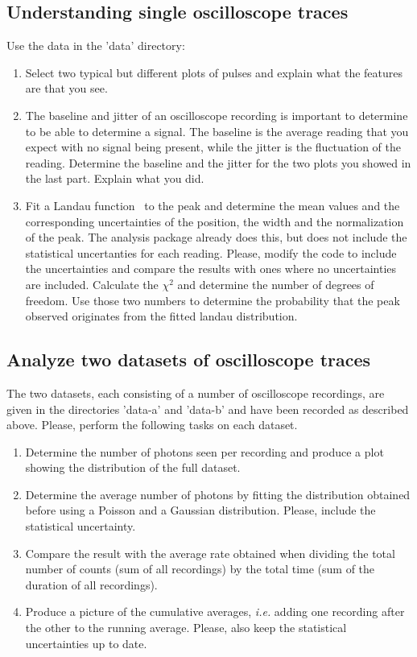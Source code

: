 \documentclass[10pt,aps,twocolumn,secnumarabic,balancelastpage,amsmath,amssymb,nofootinbib,floatfix]{revtex4}
\begin{document}
\subsection{Understanding single oscilloscope traces}
Use the data in the 'data' directory:
\begin{enumerate}
\item Select two typical but different plots of pulses and explain what the features are that you see.
\item The baseline and jitter of an oscilloscope recording is important to determine to be able to determine a signal. The baseline is the average reading that you expect with no signal being present, while the jitter is the fluctuation of the reading. Determine the baseline and the jitter for the two plots you showed in the last part. Explain what you did.
\item Fit a Landau function~\cite{cite:plandau} to the peak and determine the mean values and the corresponding uncertainties of the position, the width and the normalization of the peak. The analysis package already does this, but does not include the statistical uncertanties for each reading. Please, modify the code to include the uncertainties and compare the results with ones where no uncertainties are included. Calculate the $\chi^2$ and determine the number of degrees of freedom. Use those two numbers to determine the probability that the peak observed originates from the fitted landau distribution.
\end{enumerate}

\subsection{Analyze two datasets of oscilloscope traces}

The two datasets, each consisting of a number of oscilloscope recordings, are given in the directories 'data-a' and 'data-b' and have been recorded as described above. Please, perform the following tasks on each dataset.
\begin{enumerate}
\item Determine the number of photons seen per recording and produce a plot showing the distribution of the full dataset.
\item Determine the average number of photons by fitting the distribution obtained before using a Poisson and a Gaussian distribution. Please, include the statistical uncertainty.
\item Compare the result with the average rate obtained when dividing the total number of counts (sum of all recordings) by the total time (sum of the duration of all recordings).
\item Produce a picture of the cumulative averages, {\it i.e.} adding one recording after the other to the running average. Please, also keep the statistical uncertainties up to date.
\end{enumerate}
\end{document}
